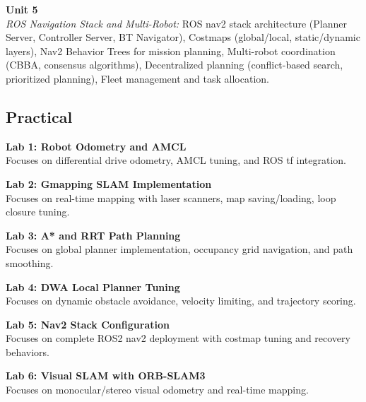 \vspace{0.3cm}

\noindent\textbf{Unit 5} \\
\textit{ROS Navigation Stack and Multi-Robot:} ROS nav2 stack architecture (Planner Server, Controller Server, BT Navigator), Costmaps (global/local, static/dynamic layers), Nav2 Behavior Trees for mission planning, Multi-robot coordination (CBBA, consensus algorithms), Decentralized planning (conflict-based search, prioritized planning), Fleet management and task allocation.

\newpage

\subsection*{Practical}
\noindent\textbf{Lab 1: Robot Odometry and AMCL} \\
Focuses on differential drive odometry, AMCL tuning, and ROS tf integration.

\vspace{0.2cm}

\noindent\textbf{Lab 2: Gmapping SLAM Implementation} \\
Focuses on real-time mapping with laser scanners, map saving/loading, loop closure tuning.

\vspace{0.2cm}

\noindent\textbf{Lab 3: A* and RRT Path Planning} \\
Focuses on global planner implementation, occupancy grid navigation, and path smoothing.

\vspace{0.2cm}

\noindent\textbf{Lab 4: DWA Local Planner Tuning} \\
Focuses on dynamic obstacle avoidance, velocity limiting, and trajectory scoring.

\vspace{0.2cm}

\noindent\textbf{Lab 5: Nav2 Stack Configuration} \\
Focuses on complete ROS2 nav2 deployment with costmap tuning and recovery behaviors.

\vspace{0.2cm}

\noindent\textbf{Lab 6: Visual SLAM with ORB-SLAM3} \\
Focuses on monocular/stereo visual odometry and real-time mapping.

\vspace{0.2cm}

